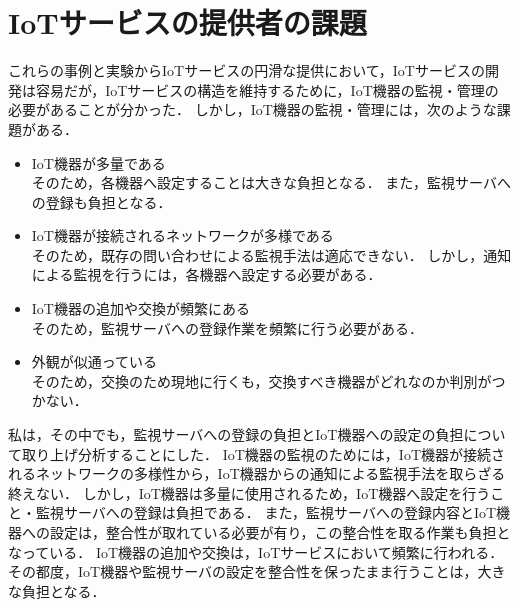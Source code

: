 \section{IoTサービスの提供者の課題}
これらの事例と実験からIoTサービスの円滑な提供において，IoTサービスの開発は容易だが，IoTサービスの構造を維持するために，IoT機器の監視・管理の必要があることが分かった．
しかし，IoT機器の監視・管理には，次のような課題がある．
\begin{itemize}
\item IoT機器が多量である\\
	そのため，各機器へ設定することは大きな負担となる．
	また，監視サーバへの登録も負担となる．
\item IoT機器が接続されるネットワークが多様である\\
	そのため，既存の問い合わせによる監視手法は適応できない．
	しかし，通知による監視を行うには，各機器へ設定する必要がある．
\item IoT機器の追加や交換が頻繁にある\\
	そのため，監視サーバへの登録作業を頻繁に行う必要がある．
\item 外観が似通っている\\
	そのため，交換のため現地に行くも，交換すべき機器がどれなのか判別がつかない．
\end{itemize}


私は，その中でも，監視サーバへの登録の負担とIoT機器への設定の負担について取り上げ分析することにした．
IoT機器の監視のためには，IoT機器が接続されるネットワークの多様性から，IoT機器からの通知による監視手法を取らざる終えない．
しかし，IoT機器は多量に使用されるため，IoT機器へ設定を行うこと・監視サーバへの登録は負担である．
また，監視サーバへの登録内容とIoT機器への設定は，整合性が取れている必要が有り，この整合性を取る作業も負担となっている．
IoT機器の追加や交換は，IoTサービスにおいて頻繁に行われる．
その都度，IoT機器や監視サーバの設定を整合性を保ったまま行うことは，大きな負担となる．


